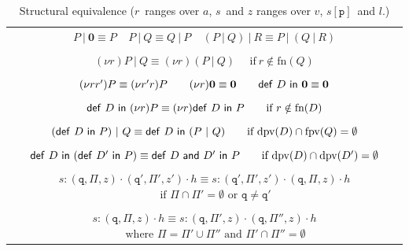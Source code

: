 \documentclass{article}
\newcommand{\ptilde}[1]{{\ensuremath{#1}}}
\newcommand{\kf}[1]{\textup{\textsf{#1}}\xspace}
\newcommand{\Ia}{\ensuremath{a}}
\newcommand{\PP}{\ensuremath{P}}
\newcommand{\Q}{\ensuremath{Q}}
\newcommand{\DD}{\ensuremath{D}}
\newcommand{\si}[2]{\ensuremath{#1[#2]}}
\newcommand{\pset}{\ensuremath{\Pi}}
\newcommand{\participant}[1]{\ensuremath{\mathtt{#1}}}
\newcommand{\q}{\ensuremath{\participant{q}}}
\newcommand{\p}{\ensuremath{\participant{p}}}
\newcommand{\s}{\ensuremath{s}}
\newcommand{\defIn}[1]{\ensuremath{\kf{def} \ #1 \ \kf{in}\ }}
\newcommand{\defD}{\ensuremath{\kf{def}\ \DD \ \kf{in}\ }}
\newcommand{\defDp}{\ensuremath{\kf{def}\ \DD' \ \kf{in}\ }}
\newcommand{\trival}[3]{\ensuremath{(#3,#2, #1)}}
\newcommand{\AND}[2]{\ensuremath{#1\ \kf{and}\ #2}}
\newcommand{\h}{\ensuremath{h}}
\newcommand{\va}{\ensuremath{v}}
\newcommand{\at}[1]{\ensuremath{\ptilde{#1}}}
\newcommand{\Par}{\ensuremath{\ |\ }}
\newcommand{\cas}{\ensuremath{r}}
\newcommand{\mqueue}[2]{\ensuremath{#1 : #2}}
\newcommand{\queue}{\ensuremath{\h}}
\newcommand{\qcomp}[2]{\ensuremath{#1 \cdot #2}}
\newcommand{\qhead}[1]{\ensuremath{\qcomp{#1}{\queue}}}
\newcommand{\freen}[1]{\ensuremath{\text{fn}(#1)}}
\newcommand{\dpv}[1]{\ensuremath{\text{dpv}(#1)}}
\newcommand{\fpv}[1]{\ensuremath{\text{fpv}(#1)}}
\begin{document}
\begin{table}[tb]
\centering
\begin{tabular}{c}
  $P \Par \textbf{0}\equiv P\ \ \ \ \ P \Par Q\equiv Q \Par P\ \ \ \ \
  (P \Par Q) \Par R\equiv P \Par (Q \Par R)$\\
  \\
  $(\nu \cas)P \Par Q\equiv (\nu \cas)(P \Par Q)\ \ \ \ \ \ \text{if}\ \cas\notin
  \freen{\Q}$\\
  \\
  $(\nu \cas\cas')P\equiv (\nu \cas'\cas)P\ \ \ \ \ \ (\nu \cas)\textbf{0}\equiv \textbf{0}\ \
  \ \ \ \ \defD\textbf{0}\equiv \textbf{0}$\\
  \\
  $\defD(\nu \cas)P\equiv (\nu \cas)\defD\PP\ \ \ \ \ \ \text{if}\ \cas\notin
  \freen{D}$\\
  \\
  $(\defD\PP) \Par Q\equiv \defD{(P \Par Q)}\ \ \ \ \ \ \text{if}\ \dpv{D}\cap
  \fpv{Q}=\emptyset$\\
  \\
  $\defD(\defDp\PP)\equiv \defIn{\AND{D}{D'}}\PP\ \ \ \ \ \ \text{if}\
  \dpv{D}\cap \dpv{D'}=\emptyset$\\
  \\
   $\mqueue{\s}{
   \qhead
    {
        \qcomp
        {\trival{z}{\pset}{\q}}
        {\trival{z'}{\pset'}{\q'}}
    }
   } \equiv
   \mqueue{\s}{
   \qhead
    {
        \qcomp
        {\trival{z'}{\pset'}{\q'}}
        {\trival{z}{\pset}{\q}}
    }
   }$ 
   $\qquad \text{if $\pset \cap \pset'=\emptyset$ or $\q \ne \q'$}$\\
   \\
   $\mqueue{\s}{
   \qhead
    {
        {\trival{z}{ \pset}{\q}}
    }
   } \equiv
   \mqueue{\s}{
   \qhead
    {
        \qcomp
        {\trival{z}{\pset'}{\q}}
        {\trival{z}{\pset''}{\q}}
    }
   }$ 
   $\qquad \text{where $\pset = \pset' \cup \pset''$ and }\pset' \cap \pset''=\emptyset$
\end{tabular}
\caption{Structural equivalence (\cas\ ranges over \Ia, \s\ and $z$ ranges over
\at{\va}, \si\s\p\ and $l$.)}\label{tab:structcong}
\end{table}
\end{document}
